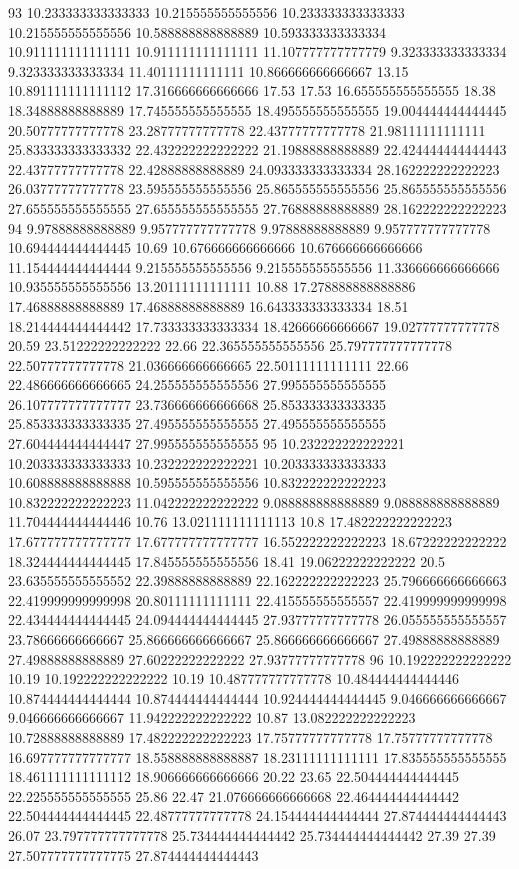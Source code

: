 93 10.233333333333333 10.215555555555556 10.233333333333333 10.215555555555556 10.588888888888889 10.593333333333334 10.911111111111111 10.911111111111111 11.107777777777779 9.323333333333334 9.323333333333334 11.40111111111111 10.866666666666667 13.15 10.891111111111112 17.316666666666666 17.53 17.53 16.655555555555555 18.38 18.34888888888889 17.745555555555555 18.495555555555555 19.004444444444445 20.50777777777778 23.28777777777778 22.43777777777778 21.98111111111111 25.833333333333332 22.432222222222222 21.19888888888889 22.424444444444443 22.43777777777778 22.42888888888889 24.093333333333334 28.162222222222223 26.03777777777778 23.595555555555556 25.865555555555556 25.865555555555556 27.655555555555555 27.655555555555555 27.76888888888889 28.162222222222223
94 9.97888888888889 9.957777777777778 9.97888888888889 9.957777777777778 10.694444444444445 10.69 10.676666666666666 10.676666666666666 11.154444444444444 9.215555555555556 9.215555555555556 11.336666666666666 10.935555555555556 13.20111111111111 10.88 17.278888888888886 17.46888888888889 17.46888888888889 16.643333333333334 18.51 18.214444444444442 17.733333333333334 18.42666666666667 19.02777777777778 20.59 23.51222222222222 22.66 22.365555555555556 25.797777777777778 22.50777777777778 21.036666666666665 22.50111111111111 22.66 22.486666666666665 24.255555555555556 27.995555555555555 26.107777777777777 23.736666666666668 25.853333333333335 25.853333333333335 27.495555555555555 27.495555555555555 27.604444444444447 27.995555555555555
95 10.232222222222221 10.203333333333333 10.232222222222221 10.203333333333333 10.608888888888888 10.595555555555556 10.832222222222223 10.832222222222223 11.042222222222222 9.088888888888889 9.088888888888889 11.704444444444446 10.76 13.021111111111113 10.8 17.482222222222223 17.677777777777777 17.677777777777777 16.552222222222223 18.67222222222222 18.324444444444445 17.845555555555556 18.41 19.06222222222222 20.5 23.635555555555552 22.39888888888889 22.162222222222223 25.796666666666663 22.419999999999998 20.80111111111111 22.415555555555557 22.419999999999998 22.434444444444445 24.094444444444445 27.93777777777778 26.055555555555557 23.78666666666667 25.866666666666667 25.866666666666667 27.49888888888889 27.49888888888889 27.60222222222222 27.93777777777778
96 10.192222222222222 10.19 10.192222222222222 10.19 10.487777777777778 10.484444444444446 10.874444444444444 10.874444444444444 10.924444444444445 9.046666666666667 9.046666666666667 11.942222222222222 10.87 13.082222222222223 10.72888888888889 17.482222222222223 17.75777777777778 17.75777777777778 16.697777777777777 18.558888888888887 18.23111111111111 17.835555555555555 18.461111111111112 18.906666666666666 20.22 23.65 22.504444444444445 22.225555555555555 25.86 22.47 21.076666666666668 22.464444444444442 22.504444444444445 22.48777777777778 24.154444444444444 27.874444444444443 26.07 23.797777777777778 25.734444444444442 25.734444444444442 27.39 27.39 27.507777777777775 27.874444444444443
